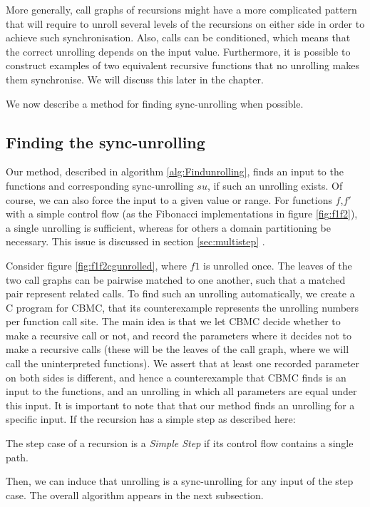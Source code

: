 More generally, call graphs of recursions might have a more complicated pattern that will require to unroll several levels of the recursions on either side in order to achieve such synchronisation. Also, calls can be conditioned, which means that the correct unrolling depends on the input value. Furthermore, it is possible to construct examples of two equivalent recursive functions that no unrolling makes them synchronise. We will discuss this later in the chapter. 

We now describe a method for finding sync-unrolling when possible.

\subsection{Finding the sync-unrolling}
Our method, described in algorithm \ref{alg:Findunrolling}, finds an input to the functions and corresponding sync-unrolling $su$, if such an unrolling exists. Of course, we can also force the input to a given value or range. For functions $f$,$f'$ with a simple control flow (as the Fibonacci implementations in figure \ref{fig:f1f2}), a single unrolling is sufficient, whereas for others a domain partitioning be necessary. This issue is discussed in section \ref{sec:multistep} . 

Consider figure \ref{fig:f1f2cgunrolled}, where $f1$ is unrolled once. The leaves of the two call graphs can be pairwise matched to one another, such that a matched pair represent related calls. To find such an unrolling automatically, we create a C program for CBMC, that its counterexample represents the unrolling numbers per function call site. The main idea is that we let CBMC decide whether to make a recursive call or not, and record the parameters where it decides not to make a recursive calls (these will be the leaves of the call graph, where we will call the uninterpreted functions). We assert that at least one recorded parameter on both sides is different, and hence a counterexample that CBMC finds is an input to the functions, and an unrolling in which all parameters are equal under this input. 
  It is important to note that that our method finds an unrolling for a specific input. If the recursion has a simple step as described here:
\begin{definition}
The step case of a recursion is a \emph{Simple Step} if its control flow contains a single path.
\end{definition}
Then, we can induce that unrolling is a sync-unrolling for any input of the step case.
The overall algorithm appears in the next subsection. 

